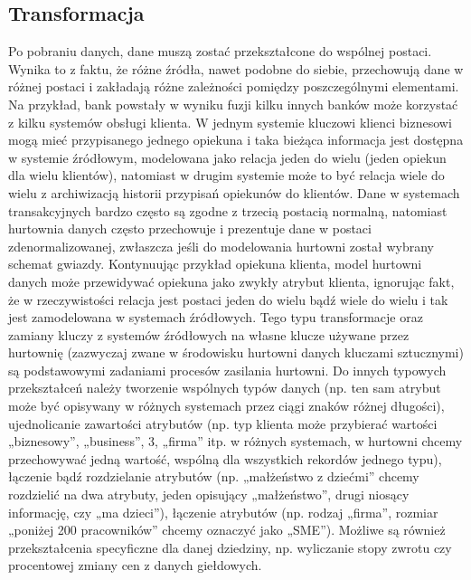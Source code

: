 \subsection{Transformacja}
Po pobraniu danych, dane muszą zostać przekształcone do wspólnej postaci.
Wynika to z faktu, że różne źródła, nawet podobne do siebie,
 przechowują dane w różnej postaci i zakładają różne zależności pomiędzy poszczególnymi elementami. 
Na przykład, bank powstały w wyniku fuzji kilku innych banków może korzystać z kilku systemów obsługi klienta. 
W jednym systemie kluczowi klienci biznesowi mogą mieć przypisanego jednego opiekuna
 i taka bieżąca informacja jest dostępna w systemie źródłowym,
 modelowana jako relacja jeden do wielu (jeden opiekun dla wielu klientów), 
 natomiast w drugim systemie może to być relacja wiele do wielu z archiwizacją historii przypisań opiekunów do klientów.
Dane w systemach transakcyjnych bardzo często są zgodne z trzecią postacią normalną,
 natomiast hurtownia danych często przechowuje i prezentuje dane w postaci zdenormalizowanej,
 zwłaszcza jeśli do modelowania hurtowni został wybrany schemat gwiazdy. 
Kontynuując przykład opiekuna klienta, model hurtowni danych może przewidywać opiekuna jako zwykły atrybut klienta,
 ignorując fakt, że w rzeczywistości relacja jest postaci jeden do wielu bądź wiele do wielu i tak jest zamodelowana w systemach źródłowych. 
Tego typu transformacje oraz zamiany kluczy z systemów źródłowych na własne klucze używane przez hurtownię 
(zazwyczaj zwane w środowisku hurtowni danych kluczami sztucznymi) są podstawowymi zadaniami procesów zasilania hurtowni.
Do innych typowych przekształceń należy tworzenie wspólnych typów danych 
 (np. ten sam atrybut może być opisywany w różnych systemach przez ciągi znaków różnej długości),
 ujednolicanie zawartości atrybutów 
 (np. typ klienta może przybierać wartości „biznesowy”, „business”, 3, „firma” itp. w różnych systemach,
 w hurtowni chcemy przechowywać jedną wartość, wspólną dla wszystkich rekordów jednego typu),
 łączenie bądź rozdzielanie atrybutów (np. „małżeństwo z dziećmi” chcemy rozdzielić na dwa atrybuty,
 jeden opisujący „małżeństwo”, drugi niosący informację, czy „ma dzieci”),
 łączenie atrybutów (np. rodzaj „firma”, rozmiar „poniżej 200 pracowników” chcemy oznaczyć jako „SME”).
 Możliwe są również przekształcenia specyficzne dla danej dziedziny,
 np. wyliczanie stopy zwrotu czy procentowej zmiany cen z danych giełdowych.


